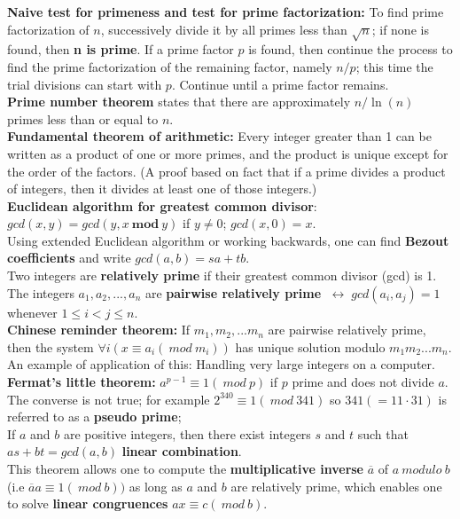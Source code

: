 \documentclass[12pt]{article}
\renewcommand{\iff}{\;\leftrightarrow\;}
\begin{document}
\textbf{Naive test for primeness and test for prime factorization:} To find prime factorization of $n$, successively divide it by all primes less than $\sqrt{n}$; if none is found, then \textbf{n is prime}. If a prime factor $p$ is found, then continue the process to find the prime factorization of the remaining factor, namely $n/p$; this time the trial divisions can start with $p$. Continue until a prime factor remains. \\
\textbf{Prime number theorem} states that there are approximately $n/\ln(n)$ primes less than or equal to $n$. \\
\textbf{Fundamental theorem of arithmetic:} Every integer greater than 1 can be written as a product of one or more primes, and the product is unique except for the order of the factors. (A proof based on fact that if a prime divides a product of integers, then it divides at least one of those integers.) \\
\textbf{Euclidean algorithm for greatest common divisor}: $gcd(x,y) = gcd(y,x\ \textbf{mod}\ y)$ if $y \neq 0$; $gcd(x,0)=x$. \\
Using extended Euclidean algorithm or working backwards, one can find \textbf{Bezout coefficients} and write $gcd(a,b) = sa+tb$. \\
Two integers are \textbf{relatively prime} if their greatest common divisor (gcd) is 1. The integers $a_1,a_2,...,a_n$ are \textbf{pairwise relatively prime} $\iff gcd(a_i,a_j) = 1$ whenever $1 \leq i < j \leq n$. \\
\textbf{Chinese reminder theorem:} If $m_1,m_2,...m_n$ are pairwise relatively prime, then the system $\forall i(x\equiv a_i (\ mod\ m_i))$ has unique solution modulo $m_1m_2...m_n$. An example of application of this: Handling very large integers on a computer. \\
\textbf{Fermat's little theorem:} $a^{p-1} \equiv 1 (\ mod\ p)$ if $p$ prime and does not divide $a$. The converse is not true; for example $2^{340} \equiv 1(\ mod\ 341)$ so $341(=11\cdot 31)$ is referred to as a \textbf{pseudo prime}; \\
If $a$ and $b$ are positive integers, then there exist integers $s$ and $t$ such that $as+bt = gcd(a,b)$ \textbf{linear combination}. \\
This theorem allows one to compute the \textbf{multiplicative inverse} $\overline{a}$ of $a\ modulo\ b$ (i.e $\overline{a}a \equiv 1 (\ mod\ b))$ as long as $a$ and $b$ are relatively prime, which enables one to solve \textbf{linear congruences} $ax \equiv c (\ mod\ b)$. \\
\end{document}
